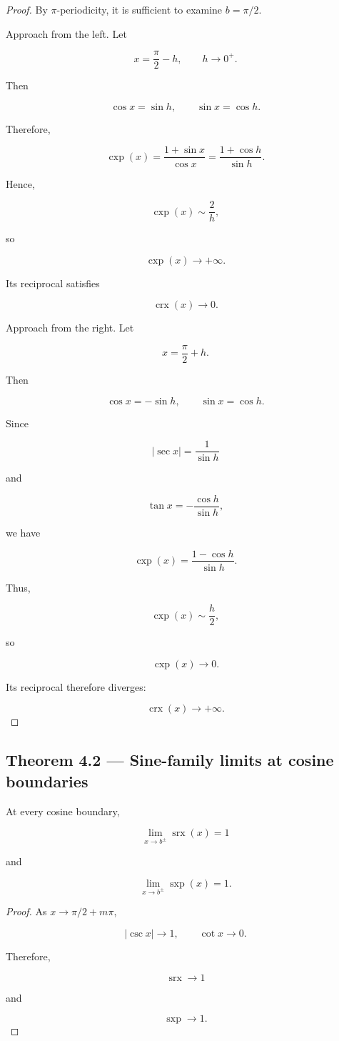 \documentclass[11pt,oneside,openany]{book}
\newcommand{\PCsubsection}[1]{%
  \subsection*{#1}%
}
\begin{document}
\begin{proof}
By \(\pi\)-periodicity, it is sufficient to examine \(b=\pi/2\).

Approach from the left. Let

\[
x=\frac{\pi}{2}-h, \qquad h\to0^+.
\]

Then

\[
\cos x=\sin h, \qquad \sin x=\cos h.
\]

Therefore,

\[
\operatorname{cxp}(x) = \frac{1+\sin x}{\cos x} = \frac{1+\cos h}{\sin h}.
\]

Hence,

\[
\operatorname{cxp}(x)\sim\frac2h,
\]

so

\[
\operatorname{cxp}(x)\to+\infty.
\]

Its reciprocal satisfies

\[
\operatorname{crx}(x)\to0.
\]

Approach from the right. Let

\[
x=\frac{\pi}{2}+h.
\]

Then

\[
\cos x=-\sin h, \qquad \sin x=\cos h.
\]

Since

\[
|\sec x|=\frac1{\sin h}
\]

and

\[
\tan x=-\frac{\cos h}{\sin h},
\]

we have

\[
\operatorname{cxp}(x) = \frac{1-\cos h}{\sin h}.
\]

Thus,

\[
\operatorname{cxp}(x) \sim \frac h2,
\]

so

\[
\operatorname{cxp}(x)\to0.
\]

Its reciprocal therefore diverges:

\[
\operatorname{crx}(x)\to+\infty.
\]

\end{proof}

\PCsubsection{Theorem 4.2 --- Sine-family limits at cosine boundaries}

At every cosine boundary,

\[
\boxed{ \lim_{x\to b^\pm}\operatorname{srx}(x)=1 }
\]

and

\[
\boxed{ \lim_{x\to b^\pm}\operatorname{sxp}(x)=1. }
\]

\begin{proof}
As \(x\to\pi/2+m\pi\),

\[
|\csc x|\to1, \qquad \cot x\to0.
\]

Therefore,

\[
\operatorname{srx}\to1
\]

and

\[
\operatorname{sxp}\to1.
\]

\end{proof}
\end{document}
